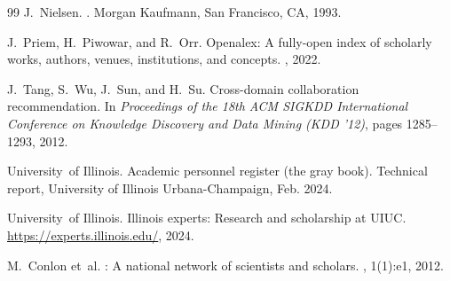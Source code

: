 \begin{thebibliography}{99}
J.~Nielsen.
.
\newblock Morgan Kaufmann, San Francisco, CA, 1993.

J.~Priem, H.~Piwowar, and R.~Orr.
\newblock Openalex: A fully-open index of scholarly works, authors, venues, institutions, and concepts.
, 2022.

J.~Tang, S.~Wu, J.~Sun, and H.~Su.
\newblock Cross-domain collaboration recommendation.
\newblock In {\em Proceedings of the 18th ACM SIGKDD International Conference on Knowledge Discovery and Data Mining (KDD '12)}, pages 1285--1293, 2012.

University~of Illinois.
\newblock Academic personnel register (the gray book).
\newblock Technical report, University of Illinois Urbana-Champaign, Feb. 2024.

University~of Illinois.
\newblock Illinois experts: Research and scholarship at {UIUC}.
\newblock \url{https://experts.illinois.edu/}, 2024.

M.~Conlon et~al.
: A national network of scientists and scholars.
, 1(1):e1, 2012.

\end{thebibliography}



